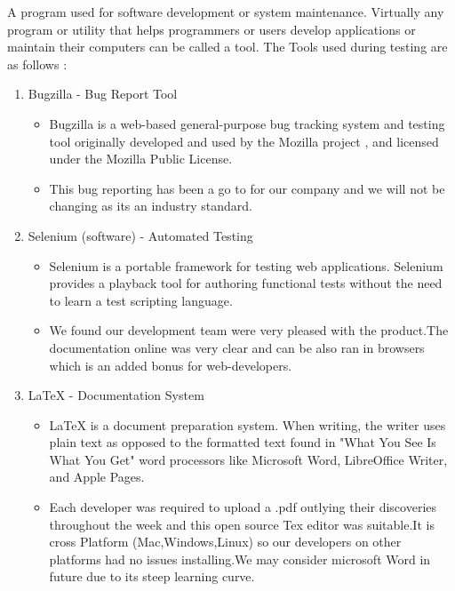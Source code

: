 A program used for software development or system maintenance. Virtually any program
or utility that helps programmers
or users develop applications or maintain their computers can be called a tool.
The Tools used during testing are as follows :

\begin{enumerate}
   \item Bugzilla - Bug Report Tool
   \begin{itemize}
     \item Bugzilla is a web-based general-purpose bug tracking system and testing tool originally developed and used by the Mozilla project
     , and licensed under the Mozilla Public License.

      \item This bug reporting has been a go to for our company and we will not be changing as its an industry standard.
   \end{itemize}
   \item Selenium (software) - Automated Testing
   \begin{itemize}
     \item Selenium is a portable framework for testing web applications. Selenium provides a playback tool for authoring
      functional tests without the need to learn a test scripting language.

         \item We found our development team were very pleased with the product.The documentation online was very clear and can be also ran in browsers which is an added bonus for web-developers.
   \end{itemize}

   \item  LaTeX - Documentation System
   \begin{itemize}
     \item LaTeX is a document preparation system. When writing, the writer uses plain text as opposed to the formatted text found in "What You See Is What You Get"
      word processors like Microsoft Word, LibreOffice Writer, and Apple Pages.


       \item Each developer was required to upload a .pdf outlying their discoveries throughout the week and this open source Tex editor was suitable.It is cross Platform (Mac,Windows,Linux) so our developers on other platforms had no issues installing.We may consider microsoft Word in future due to its steep learning curve.
   \end{itemize}



\end{enumerate}
